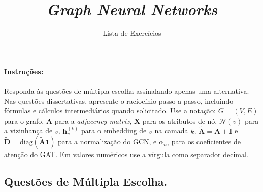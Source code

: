 \documentclass{dlproblemset}
\title{\textit{Graph Neural Networks}}
\subtitle{Lista de Exercícios}
\begin{document}
\paragraph{Instruções:} Responda às questões de múltipla escolha assinalando apenas uma alternativa. Nas questões dissertativas, apresente o raciocínio passo a passo, incluindo fórmulas e cálculos intermediários quando solicitado. Use a notação: $G = (V, E)$ para o grafo, $\mathbf{A}$ para a \textit{adjacency matrix}, $\mathbf{X}$ para os atributos de nó, $\mathcal{N}(v)$ para a vizinhança de $v$, $\mathbf{h}^{(k)}_v$ para o embedding de $v$ na camada $k$, $\tilde{\mathbf{A}} = \mathbf{A} + \mathbf{I}$ e $\tilde{\mathbf{D}} = \mathrm{diag}(\tilde{\mathbf{A}} \mathbf{1})$ para a normalização do GCN, e $\alpha_{vu}$ para os coeficientes de atenção do GAT. Em valores numéricos use a vírgula como separador decimal.

\subsection*{Questões de Múltipla Escolha.}
\end{document}
